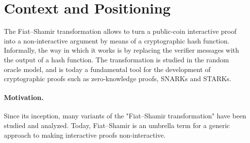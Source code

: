 \documentclass{article}
\begin{document}
\clearpage
\section{Context and Positioning}


The Fiat--Shamir transformation allows to turn a public-coin interactive proof into a non-interactive argument by means of a cryptographic hash function.
Informally, the way in which it works is by replacing the verifier messages with the output of a hash function. The transformation is studied in the random oracle model, and is today a fundamental tool for the development of cryptographic proofs such as zero-knowledge proofs, SNARKs and STARKs.

\paragraph{Motivation.}
Since its inception, many variants of the "Fiat--Shamir transformation" have been studied and analyzed. Today, Fiat--Shamir is an umbrella term for a generic approach to making interactive proofs non-interactive.
\end{document}
